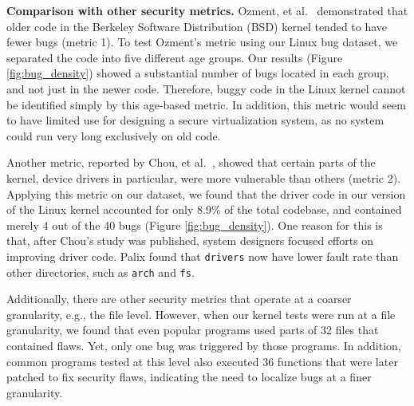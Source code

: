 \noindent
{\bf Comparison with other security metrics.}
Ozment, et al.~\cite{ozment2006milk} demonstrated that older code in the
Berkeley Software Distribution (BSD) \cite{BSD}
kernel tended to have fewer bugs (metric 1).
To test Ozment's metric using our Linux bug dataset,
we separated the code into five different age groups.
Our results (Figure \ref{fig:bug_density}) showed a substantial
number of bugs located in each group, and not just in the newer code.
Therefore, buggy code in the Linux kernel cannot be identified simply
by this age-based metric.
In addition, this metric would seem to have limited use for designing a secure
virtualization system,
as no system could run very long exclusively on old code.

Another metric, reported by Chou, et al.~\cite{PittSFIeld}, showed that certain parts of the kernel,
device drivers in particular, were more vulnerable than others (metric 2).
Applying this metric on our dataset, we found that the driver code in our version
of the Linux kernel accounted for only 8.9\% of the total codebase, and contained
merely 4 out of the 40 bugs (Figure \ref{fig:bug_density}).
One reason for this is that, after Chou's study was published, system
designers focused efforts on improving driver code. Palix \cite{palix2011faults}
found that %
\texttt{drivers} now have lower fault rate than other directories,
such as \texttt{arch} and \texttt{fs}.


Additionally, there are other security metrics that operate at a coarser granularity,
e.g., the file level. However, when our kernel tests were run at a file
granularity, we found that even popular programs used parts of %
32 files that contained flaws. Yet, only one bug was triggered by those programs.
In addition, common programs tested at this level also executed 36 functions
that were later patched to fix security
flaws, indicating the need to localize bugs at a finer granularity.

